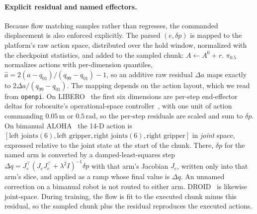 \paragraph{Explicit residual and named effectors.}
Because flow matching samples rather than regresses, the commanded displacement is also enforced explicitly. The parsed $(e, \delta p)$ is mapped to the platform's raw action space, distributed over the hold window, normalized with the checkpoint statistics, and added to the sampled chunk: $A \leftarrow A^{0} + r$. $\pi_{0.5}$ normalizes actions with per-dimension quantiles, $\hat a = 2(a-q_{01})/(q_{99}-q_{01}) - 1$, so an additive raw residual $\Delta a$ maps exactly to $2\Delta a/(q_{99}-q_{01})$. The mapping depends on the action layout, which we read from \texttt{openpi}. On LIBERO~\citep{liu2023libero} the first six dimensions are per-step end-effector deltas for robosuite's operational-space controller~\citep{zhu2020robosuite}, with one unit of action commanding $0.05$\,m or $0.5$\,rad, so the per-step residuals are scaled and sum to $\delta p$. On bimanual ALOHA~\citep{zhao2023aloha} the 14-D action is $[\text{left joints}(6), \text{left gripper}, \text{right joints}(6), \text{right gripper}]$ in \emph{joint} space, expressed relative to the joint state at the start of the chunk. There, $\delta p$ for the named arm is converted by a damped-least-squares step $\Delta q = J_e^\top (J_e J_e^\top + \lambda^2 I)^{-1}\delta p$ with that arm's Jacobian $J_e$, written only into that arm's slice, and applied as a ramp whose final value is $\Delta q$. An unnamed correction on a bimanual robot is not routed to either arm. DROID~\citep{khazatsky2024droid} is likewise joint-space. During training, the flow is fit to the executed chunk minus this residual, so the sampled chunk plus the residual reproduces the executed actions.

